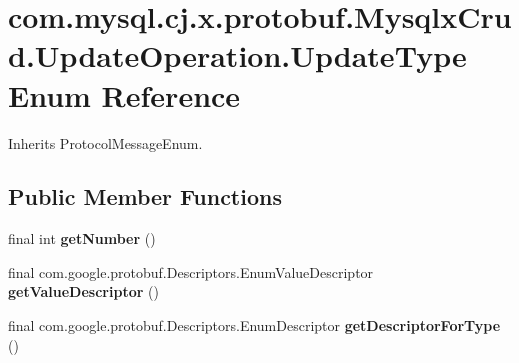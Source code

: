 \hypertarget{enumcom_1_1mysql_1_1cj_1_1x_1_1protobuf_1_1_mysqlx_crud_1_1_update_operation_1_1_update_type}{}\section{com.\+mysql.\+cj.\+x.\+protobuf.\+Mysqlx\+Crud.\+Update\+Operation.\+Update\+Type Enum Reference}
\label{enumcom_1_1mysql_1_1cj_1_1x_1_1protobuf_1_1_mysqlx_crud_1_1_update_operation_1_1_update_type}


Inherits Protocol\+Message\+Enum.

\subsection*{Public Member Functions}
\begin{DoxyCompactItemize}
\item 
\mbox{\label{enumcom_1_1mysql_1_1cj_1_1x_1_1protobuf_1_1_mysqlx_crud_1_1_update_operation_1_1_update_type_a3842696acafec908befaae0a1a1f7b3e}} 
final int {\bfseries get\+Number} ()
\item 
\mbox{\label{enumcom_1_1mysql_1_1cj_1_1x_1_1protobuf_1_1_mysqlx_crud_1_1_update_operation_1_1_update_type_a5dadb1bbf62a697ea0f0662452756ae5}} 
final com.\+google.\+protobuf.\+Descriptors.\+Enum\+Value\+Descriptor {\bfseries get\+Value\+Descriptor} ()
\item 
\mbox{\label{enumcom_1_1mysql_1_1cj_1_1x_1_1protobuf_1_1_mysqlx_crud_1_1_update_operation_1_1_update_type_a80a3f7fb831e95666b6fc9b451c73da5}} 
final com.\+google.\+protobuf.\+Descriptors.\+Enum\+Descriptor {\bfseries get\+Descriptor\+For\+Type} ()
\end{DoxyCompactItemize}

